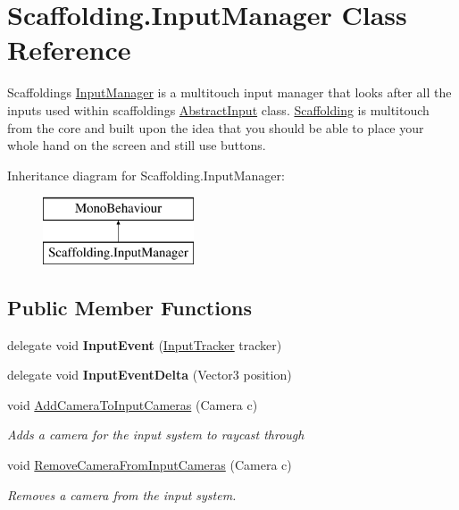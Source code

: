 \hypertarget{class_scaffolding_1_1_input_manager}{\section{Scaffolding.\+Input\+Manager Class Reference}
\label{class_scaffolding_1_1_input_manager}
}


Scaffoldings \hyperlink{class_scaffolding_1_1_input_manager}{Input\+Manager} is a multitouch input manager that looks after all the inputs used within scaffoldings \hyperlink{class_scaffolding_1_1_abstract_input}{Abstract\+Input} class. \hyperlink{namespace_scaffolding}{Scaffolding} is multitouch from the core and built upon the idea that you should be able to place your whole hand on the screen and still use buttons.  


Inheritance diagram for Scaffolding.\+Input\+Manager\+:\begin{figure}[H]
\begin{center}
\leavevmode
\includegraphics[height=2.000000cm]{class_scaffolding_1_1_input_manager}
\end{center}
\end{figure}
\subsection*{Public Member Functions}
\begin{DoxyCompactItemize}
\item 
\hypertarget{class_scaffolding_1_1_input_manager_ae7622b2ff061b41fef5b7949cef8804b}{delegate void {\bfseries Input\+Event} (\hyperlink{class_scaffolding_1_1_input_tracker}{Input\+Tracker} tracker)}\label{class_scaffolding_1_1_input_manager_ae7622b2ff061b41fef5b7949cef8804b}

\item 
\hypertarget{class_scaffolding_1_1_input_manager_a5f228d24dde2dfd00bf06d20631d2467}{delegate void {\bfseries Input\+Event\+Delta} (Vector3 position)}\label{class_scaffolding_1_1_input_manager_a5f228d24dde2dfd00bf06d20631d2467}

\item 
void \hyperlink{class_scaffolding_1_1_input_manager_a59ef69171ed726247fb89d51fc322f55}{Add\+Camera\+To\+Input\+Cameras} (Camera c)
\begin{DoxyCompactList}\small\item\em Adds a camera for the input system to raycast through \end{DoxyCompactList}\item 
void \hyperlink{class_scaffolding_1_1_input_manager_a0617c8a11b9c068a34121ee7d5c7b60b}{Remove\+Camera\+From\+Input\+Cameras} (Camera c)
\begin{DoxyCompactList}\small\item\em Removes a camera from the input system. \end{DoxyCompactList}\end{DoxyCompactItemize}
